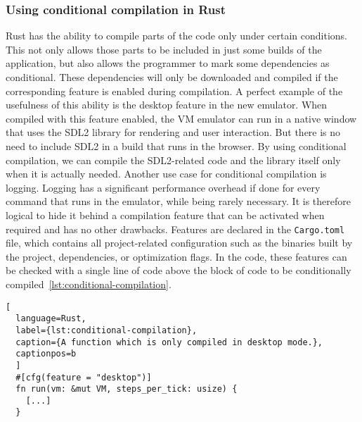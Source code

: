 \subsubsection{Using conditional compilation in Rust} \label{conditional-compilation}
Rust has the ability to compile parts of the code only under certain conditions.
This not only allows those parts to be included in just some builds of the application, but also allows the programmer to mark some dependencies as conditional.
These dependencies will only be downloaded and compiled if the corresponding feature is enabled during compilation.
A perfect example of the usefulness of this ability is the desktop feature in the new emulator.
When compiled with this feature enabled, the VM emulator can run in a native window that uses the SDL2 library for rendering and user interaction.
But there is no need to include SDL2 in a build that runs in the browser.
By using conditional compilation, we can compile the SDL2-related code and the library itself only when it is actually needed.
Another use case for conditional compilation is logging.
Logging has a significant performance overhead if done for every command that runs in the emulator, while being rarely necessary.
It is therefore logical to hide it behind a compilation feature that can be activated when required and has no other drawbacks.
Features are declared in the \verb+Cargo.toml+ file, which contains all project-related configuration such as the binaries built by the project, dependencies, or optimization flags.
In the code, these features can be checked with a single line of code above the block of code to be conditionally compiled~\ref{lst:conditional-compilation}.

\begin{lstlisting}[
  language=Rust,
  label={lst:conditional-compilation},
  caption={A function which is only compiled in desktop mode.},
  captionpos=b
  ]
  #[cfg(feature = "desktop")]
  fn run(vm: &mut VM, steps_per_tick: usize) {
    [...]
  }
\end{lstlisting}

